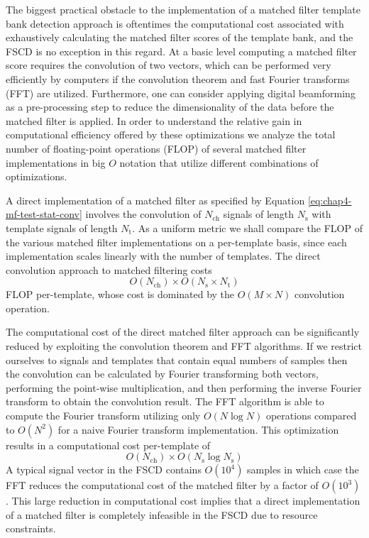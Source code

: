 The biggest practical obstacle to the implementation of a matched filter template bank detection approach is oftentimes the computational cost associated with exhaustively calculating the matched filter scores of the template bank, and the FSCD is no exception in this regard. At a basic level computing a matched filter score requires the convolution of two vectors, which can be performed very efficiently by computers if the convolution theorem and fast Fourier transforms (FFT) are utilized. Furthermore, one can consider applying digital beamforming as a pre-processing step to reduce the dimensionality of the data before the matched filter is applied. In order to understand the relative gain in computational efficiency offered by these optimizations we analyze the total number of floating-point operations (FLOP) of several matched filter implementations in big $O$ notation that utilize different combinations of optimizations. 

A direct implementation of a matched filter as specified by Equation \ref{eq:chap4-mf-test-stat-conv} involves the convolution of $N_\mathrm{ch}$ signals of length $N_\mathrm{s}$ with template signals of length $N_\mathrm{t}$. As a uniform metric we shall compare the FLOP of the various matched filter implementations on a per-template basis, since each implementation scales linearly with the number of templates. The direct convolution approach to matched filtering costs
\begin{equation}
    O(N_\mathrm{ch})\times O(N_\mathrm{s}\times N_\mathrm{t})
\end{equation}
FLOP per-template, whose cost is dominated by the $O(M\times N)$ convolution operation. 

The computational cost of the direct matched filter approach can be significantly reduced by exploiting the convolution theorem and FFT algorithms. If we restrict ourselves to signals and templates that contain equal numbers of samples then the convolution can be calculated by Fourier transforming both vectors, performing the point-wise multiplication, and then performing the inverse Fourier transform to obtain the convolution result. The FFT algorithm is able to compute the Fourier transform utilizing only $O(N\log{N})$ operations compared to $O(N^2)$ for a naive Fourier transform implementation. This optimization results in a computational cost per-template of
\begin{equation}
    O(N_\mathrm{ch})\times O(N_\mathrm{s}\log{N_\mathrm{s}})
\end{equation}
A typical signal vector in the FSCD contains $O(10^4)$ samples in which case the FFT reduces the computational cost of the matched filter by a factor of $O(10^3)$. This large reduction in computational cost implies that a direct implementation of a matched filter is completely infeasible in the FSCD due to resource constraints. 

